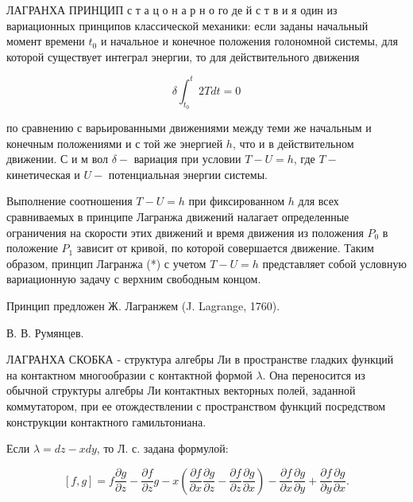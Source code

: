 \documentclass[10pt]{article}
\begin{document}
ЛАГРАНХА ПРИНЦИП с т а ц о н а р н о го де й с т в и я один из вариационных принципов классической механики: если заданы начальный момент времени $t_{0}$ и начальное и конечное положения голономной системы, для которой существует интеграл энергии, то для действительного движения



\[

\delta \int_{t_{0}}^{t} 2 T d t=0

\]



по сравнению с варьированными движениями между теми же начальным и конечным положениями и с той же энергией $h$, что и в действительном движении. С и м вол $\delta-$ вариация при условии $T-U=h$, где $T-$ кинетическая и $U-$ потенциальная энергии системы.



Выполнение соотношения $T-U=h$ при фиксированном $h$ для всех сравниваемых в принципе Лагранжа движений налагает определенные ограничения на скорости этих движений и время движения из положения $P_{0}$ в положение $P_{1}$ зависит от кривой, по которой совершается движение. Таким образом, принцип Лагранжа (*) с учетом $T-U=h$ представляет собой условную вариационную задачу с верхним свободным концом.



Принцип предложен Ж. Лагранжем (J. Lagrange, 1760).



В. В. Румянцев.



ЛАГРАНХА СКОБКА - структура алгебры Ли в пространстве гладких функций на контактном многообразии с контактной формой $\lambda$. Она переносится из обычной структуры алгебры Ли контактных векторных полей, заданной коммутатором, при ее отождествлении с пространством функций посредством конструкции контактного гамильтониана.



Если $\lambda=d z-x d y$, то Л. с. задана формулой:



\[

[f, g]=f \frac{\partial g}{\partial z}-\frac{\partial f}{\partial z} g-x\left(\frac{\partial f}{\partial x} \frac{\partial g}{\partial z}-\frac{\partial f}{\partial z} \frac{\partial g}{\partial x}\right)-\frac{\partial f}{\partial x} \frac{\partial g}{\partial y}+\frac{\partial f}{\partial y} \frac{\partial g}{\partial x} .

\]
\end{document}
